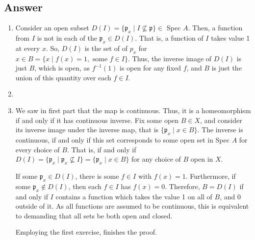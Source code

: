 \documentclass[11pt]{article}
\begin{document}
\subsection{Answer}
\begin{enumerate}
\item Consider an open subset $D(I) = \{ \mathfrak{p}_x \mid I \nsubseteq \mathfrak{p} \} \in $ Spec $A$. Then, a function from $I$ is not in each of the  $\mathfrak{p}_x \in D(I)$. That is, a function of $I$ takes value 1 at every $x$. So, $D(I)$ is the set of of $p_x$ for $x \in B = \{ x \mid f(x) =1, \mbox{ some }  f \in I\}$. Thus, the inverse image of $D(I)$ is just $B$, which is open, as $f^{-1}(1)$ is open for any fixed $f$, and $B$ is just the union of this quantity over each $f \in I$.

\item 
\item We saw in first part that the map is continuous. Thus, it is a homeomorphism if and only if it has continuous inverse. Fix some open $B \in X$, and consider its inverse image under the inverse map, that is $\{\mathfrak{p}_x \mid x \in B \}$. The inverse is continuous, if and only if this set corresponds to some open set in Spec $A$ for every choice of $B$. That is, if and only if $D(I) = \{ \mathfrak{p}_x \mid \mathfrak p_x \nsubseteq I \} = \{\mathfrak{p}_x \mid x \in B \}$ for any choice of $B$ open in $X$.

If some $\mathfrak p _ x \in D(I)$, there is some $f \in I$ with $f(x) = 1$. Furthermore, if some $\mathfrak p _ x \notin D(I)$, then  each $f \in I$ has $f(x) = 0$. Therefore, $B = D(I) $ if and only if $I$ contains a function which takes the value 1 on all of $B$, and 0 outside of it. As all functions are assumed to be continuous, this is equivalent to demanding that all sets be both open and closed.

Employing the first exercise, finishes the proof.
\end{enumerate}
\end{document}

